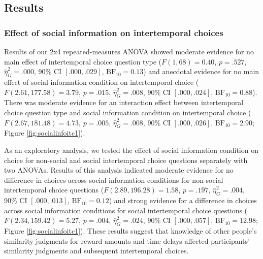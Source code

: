 \documentclass[
  pub,floatsintext]{apa6}
\begin{document}
\hypertarget{results}{%
\subsection{Results}\label{results}}

\hypertarget{effect-of-social-information-on-intertemporal-choices}{%
\subsubsection{Effect of social information on intertemporal choices}\label{effect-of-social-information-on-intertemporal-choices}}

Results of our 2x4 repeated-measures ANOVA showed moderate evidence for no main effect of intertemporal choice question type (\(F(1, 68) = 0.40\), \(p = .527\), \(\hat{\eta}^2_G = .000\), 90\% CI \([.000, .029]\), \(\mathrm{BF}_{\textrm{10}} = 0.13\)) and anecdotal evidence for no main effect of social information condition on intertemporal choice (\(F(2.61, 177.58) = 3.79\), \(p = .015\), \(\hat{\eta}^2_G = .008\), 90\% CI \([.000, .024]\), \(\mathrm{BF}_{\textrm{10}} = 0.88\)). There was moderate evidence for an interaction effect between intertemporal choice question type and social information condition on intertemporal choice (\(F(2.67, 181.48) = 4.73\), \(p = .005\), \(\hat{\eta}^2_G = .008\), 90\% CI \([.000, .026]\), \(\mathrm{BF}_{\textrm{10}} = 2.90\); Figure \ref{fig:socialinfoitc1}).

As an exploratory analysis, we tested the effect of social information condition on choice for non-social and social intertemporal choice questions separately with two ANOVAs. Results of this analysis indicated moderate evidence for no difference in choices across social information conditions for non-social intertemporal choice questions (\(F(2.89, 196.28) = 1.58\), \(p = .197\), \(\hat{\eta}^2_G = .004\), 90\% CI \([.000, .013]\), \(\mathrm{BF}_{\textrm{10}} = 0.12\)) and strong evidence for a difference in choices across social information conditions for social intertemporal choice questions (\(F(2.34, 159.42) = 5.27\), \(p = .004\), \(\hat{\eta}^2_G = .024\), 90\% CI \([.000, .057]\), \(\mathrm{BF}_{\textrm{10}} = 12.98\); Figure \ref{fig:socialinfoitc1}). These results suggest that knowledge of other people's similarity judgments for reward amounts and time delays affected participants' similarity judgments and subsequent intertemporal choices.
\end{document}
